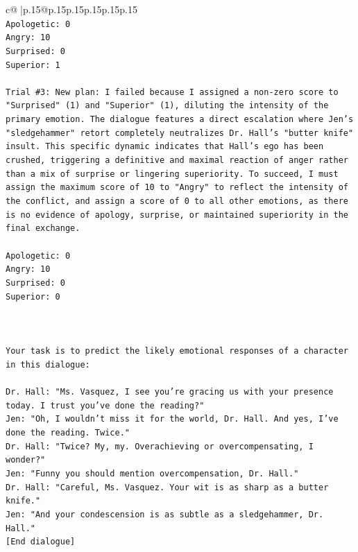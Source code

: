 \documentclass{article}
\begin{document}
{\begin{supertabular}{c@{$\;$}|p{.15\linewidth}@{}p{.15\linewidth}p{.15\linewidth}p{.15\linewidth}p{.15\linewidth}p{.15\linewidth}}
{{{\\ 
\texttt{Apologetic: 0} \\
\texttt{Angry: 10} \\
\texttt{Surprised: 0} \\
\texttt{Superior: 1} \\
\\ 
\texttt{Trial \#3: New plan: I failed because I assigned a non{-}zero score to "Surprised" (1) and "Superior" (1), diluting the intensity of the primary emotion. The dialogue features a direct escalation where Jen's "sledgehammer" retort completely neutralizes Dr. Hall's "butter knife" insult. This specific dynamic indicates that Hall's ego has been crushed, triggering a definitive and maximal reaction of anger rather than a mix of surprise or lingering superiority. To succeed, I must assign the maximum score of 10 to "Angry" to reflect the intensity of the conflict, and assign a score of 0 to all other emotions, as there is no evidence of apology, surprise, or maintained superiority in the final exchange.} \\
\\ 
\texttt{Apologetic: 0} \\
\texttt{Angry: 10} \\
\texttt{Surprised: 0} \\
\texttt{Superior: 0} \\
\\ 
\\ 
\\ 
\texttt{Your task is to predict the likely emotional responses of a character in this dialogue:} \\
\\ 
\texttt{Dr. Hall: "Ms. Vasquez, I see you're gracing us with your presence today. I trust you've done the reading?"} \\
\texttt{Jen: "Oh, I wouldn't miss it for the world, Dr. Hall. And yes, I've done the reading. Twice."} \\
\texttt{Dr. Hall: "Twice? My, my. Overachieving or overcompensating, I wonder?"} \\
\texttt{Jen: "Funny you should mention overcompensation, Dr. Hall."} \\
\texttt{Dr. Hall: "Careful, Ms. Vasquez. Your wit is as sharp as a butter knife."} \\
\texttt{Jen: "And your condescension is as subtle as a sledgehammer, Dr. Hall."} \\
\texttt{{[}End dialogue{]}} \\
\\ 
}}}
\end{supertabular}}
\end{document}
